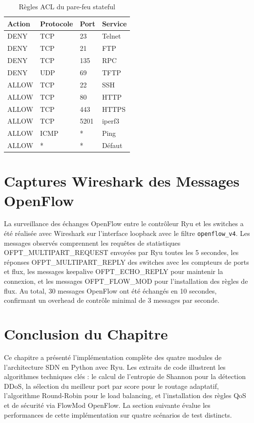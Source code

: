 \documentclass[12pt,a4paper]{report}
\begin{document}
\begin{table}[H]
\centering
\caption{Règles ACL du pare-feu stateful}
\label{tab:acl}
\begin{tabular}{llll}
\toprule
\textbf{Action} & \textbf{Protocole} &
\textbf{Port} & \textbf{Service} \\
\midrule
DENY & TCP & 23 & Telnet \\
DENY & TCP & 21 & FTP \\
DENY & TCP & 135 & RPC \\
DENY & UDP & 69 & TFTP \\
ALLOW & TCP & 22 & SSH \\
ALLOW & TCP & 80 & HTTP \\
ALLOW & TCP & 443 & HTTPS \\
ALLOW & TCP & 5201 & iperf3 \\
ALLOW & ICMP & * & Ping \\
ALLOW & * & * & Défaut \\
\bottomrule
\end{tabular}
\end{table}

\section{Captures Wireshark des Messages OpenFlow}
La surveillance des échanges OpenFlow entre le contrôleur
Ryu et les switches a été réalisée avec Wireshark sur
l'interface loopback avec le filtre \texttt{openflow\_v4}.
Les messages observés comprennent les requêtes de
statistiques OFPT\_MULTIPART\_REQUEST envoyées par Ryu
toutes les 5 secondes, les réponses OFPT\_MULTIPART\_REPLY
des switches avec les compteurs de ports et flux, les
messages keepalive OFPT\_ECHO\_REPLY pour maintenir la
connexion, et les messages OFPT\_FLOW\_MOD pour
l'installation des règles de flux. Au total, 30 messages
OpenFlow ont été échangés en 10 secondes, confirmant un
overhead de contrôle minimal de 3 messages par seconde.

\section{Conclusion du Chapitre}
Ce chapitre a présenté l'implémentation complète des
quatre modules de l'architecture SDN en Python avec Ryu.
Les extraits de code illustrent les algorithmes techniques
clés : le calcul de l'entropie de Shannon pour la
détection DDoS, la sélection du meilleur port par score
pour le routage adaptatif, l'algorithme Round-Robin pour
le load balancing, et l'installation des règles QoS et
de sécurité via FlowMod OpenFlow. La section suivante
évalue les performances de cette implémentation sur
quatre scénarios de test distincts.
\newpage
\end{document}
